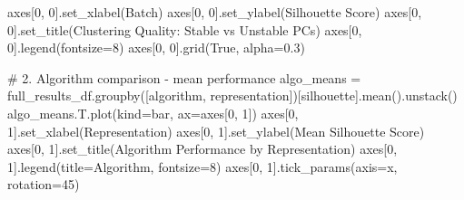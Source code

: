 \documentclass[
  letterpaper,
  DIV=11,
  numbers=noendperiod]{scrartcl}
\newenvironment{Shaded}{\begin{snugshade}}{\end{snugshade}}
\newcommand{\CommentTok}[1]{\textcolor[rgb]{0.37,0.37,0.37}{#1}}
\newcommand{\DecValTok}[1]{\textcolor[rgb]{0.68,0.00,0.00}{#1}}
\newcommand{\FloatTok}[1]{\textcolor[rgb]{0.68,0.00,0.00}{#1}}
\newcommand{\NormalTok}[1]{\textcolor[rgb]{0.00,0.23,0.31}{#1}}
\newcommand{\OperatorTok}[1]{\textcolor[rgb]{0.37,0.37,0.37}{#1}}
\newcommand{\StringTok}[1]{\textcolor[rgb]{0.13,0.47,0.30}{#1}}
\newcommand{\VariableTok}[1]{\textcolor[rgb]{0.07,0.07,0.07}{#1}}
\renewenvironment{Shaded}{%
  \begin{tcolorbox}[%
    enhanced,%
    colback=codebg,%
    colframe=codebg,%
    borderline west={3pt}{0pt}{sectionblue},%
    fontupper=\small\ttfamily,%
    boxrule=0pt,%
    arc=0pt,%
    boxsep=5pt,%
    left=2mm,%
    right=2mm,%
    top=2mm,%
    bottom=2mm%
  ]%
}{%
  \end{tcolorbox}%
}
\begin{document}
\begin{Shaded}
\begin{Highlighting}[]
\NormalTok{axes[}\DecValTok{0}\NormalTok{, }\DecValTok{0}\NormalTok{].set\_xlabel(}\StringTok{\textquotesingle{}Batch\textquotesingle{}}\NormalTok{)}
\NormalTok{axes[}\DecValTok{0}\NormalTok{, }\DecValTok{0}\NormalTok{].set\_ylabel(}\StringTok{\textquotesingle{}Silhouette Score\textquotesingle{}}\NormalTok{)}
\NormalTok{axes[}\DecValTok{0}\NormalTok{, }\DecValTok{0}\NormalTok{].set\_title(}\StringTok{\textquotesingle{}Clustering Quality: Stable vs Unstable PCs\textquotesingle{}}\NormalTok{)}
\NormalTok{axes[}\DecValTok{0}\NormalTok{, }\DecValTok{0}\NormalTok{].legend(fontsize}\OperatorTok{=}\DecValTok{8}\NormalTok{)}
\NormalTok{axes[}\DecValTok{0}\NormalTok{, }\DecValTok{0}\NormalTok{].grid(}\VariableTok{True}\NormalTok{, alpha}\OperatorTok{=}\FloatTok{0.3}\NormalTok{)}

\CommentTok{\# 2. Algorithm comparison {-} mean performance}
\NormalTok{algo\_means }\OperatorTok{=}\NormalTok{ full\_results\_df.groupby([}\StringTok{\textquotesingle{}algorithm\textquotesingle{}}\NormalTok{, }\StringTok{\textquotesingle{}representation\textquotesingle{}}\NormalTok{])[}\StringTok{\textquotesingle{}silhouette\textquotesingle{}}\NormalTok{].mean().unstack()}
\NormalTok{algo\_means.T.plot(kind}\OperatorTok{=}\StringTok{\textquotesingle{}bar\textquotesingle{}}\NormalTok{, ax}\OperatorTok{=}\NormalTok{axes[}\DecValTok{0}\NormalTok{, }\DecValTok{1}\NormalTok{])}
\NormalTok{axes[}\DecValTok{0}\NormalTok{, }\DecValTok{1}\NormalTok{].set\_xlabel(}\StringTok{\textquotesingle{}Representation\textquotesingle{}}\NormalTok{)}
\NormalTok{axes[}\DecValTok{0}\NormalTok{, }\DecValTok{1}\NormalTok{].set\_ylabel(}\StringTok{\textquotesingle{}Mean Silhouette Score\textquotesingle{}}\NormalTok{)}
\NormalTok{axes[}\DecValTok{0}\NormalTok{, }\DecValTok{1}\NormalTok{].set\_title(}\StringTok{\textquotesingle{}Algorithm Performance by Representation\textquotesingle{}}\NormalTok{)}
\NormalTok{axes[}\DecValTok{0}\NormalTok{, }\DecValTok{1}\NormalTok{].legend(title}\OperatorTok{=}\StringTok{\textquotesingle{}Algorithm\textquotesingle{}}\NormalTok{, fontsize}\OperatorTok{=}\DecValTok{8}\NormalTok{)}
\NormalTok{axes[}\DecValTok{0}\NormalTok{, }\DecValTok{1}\NormalTok{].tick\_params(axis}\OperatorTok{=}\StringTok{\textquotesingle{}x\textquotesingle{}}\NormalTok{, rotation}\OperatorTok{=}\DecValTok{45}\NormalTok{)}


\end{Highlighting}
\end{Shaded}
\end{document}
